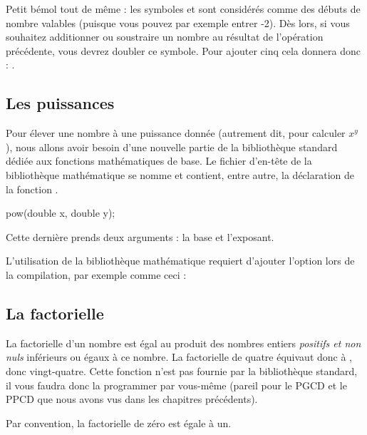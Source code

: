 \begin{infobox}
Petit bémol tout de même : les
symboles \mybox{+} et \mybox{-} sont considérés comme des débuts de
nombre valables (puisque vous pouvez par exemple entrer -2). Dès lors,
si vous souhaitez additionner ou soustraire un nombre au résultat de
l'opération précédente, vous devrez doubler ce symbole. Pour ajouter
cinq cela donnera donc : . 
\end{infobox}


\subsection{Les puissances}
\label{les-puissances}

Pour élever une nombre à une puissance donnée (autrement dit, pour
calculer \(x^y\)), nous allons avoir besoin d'une nouvelle partie de la
bibliothèque standard dédiée aux fonctions mathématiques de base. Le
fichier d'en-tête de la bibliothèque mathématique se nomme
 et contient, entre autre, la
déclaration de la fonction .

\begin{C}
\enddouble pow(double x, double y);
\end{C}

Cette dernière prends deux arguments : la base et l'exposant.

\begin{attentionbox}
L'utilisation de la bibliothèque
mathématique requiert d'ajouter l'option  lors de la
compilation, par exemple comme ceci : 
\end{attentionbox}


\subsection{La factorielle}
\label{la-factorielle}

La factorielle d'un nombre est égal au produit des nombres entiers
\emph{positifs et non nuls} inférieurs ou égaux à ce nombre. La
factorielle de quatre équivaut donc à , donc
vingt-quatre. Cette fonction n'est pas fournie par la bibliothèque
standard, il vous faudra donc la programmer par vous-même (pareil pour
le PGCD et le PPCD que nous avons vus dans les chapitres précédents).

\begin{infobox}
Par convention, la factorielle de
zéro est égale à un.
\end{infobox}


